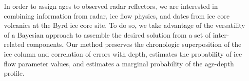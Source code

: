 


In order to assign ages to observed radar reflectors, we are interested in combining information from radar, ice flow physics, and dates from ice core volcanics at the Byrd ice core site. To do so, we take advantage of the versatility of a Bayesian approach to assemble the desired solution from a set of inter-related components.  Our method preserves the chronologic superposition of the ice column and correlation of errors with depth, estimates the probability of ice flow parameter values, and estimates a marginal probability of the age-depth profile. 




